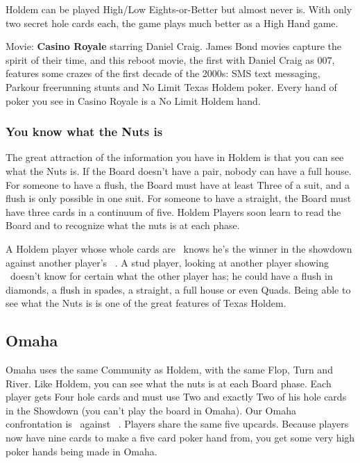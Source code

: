 Holdem can be played High/Low Eights-or-Better but almost never
is. With only two secret hole cards each, the game plays much better
as a High Hand game.

Movie: \textbf{Casino Royale} starring Daniel Craig. James Bond movies
capture the spirit of their time, and this reboot movie, the first
with Daniel Craig as 007, features some crazes of the first decade of
the 2000s: SMS text messaging, Parkour freerunning stunts and No Limit
Texas Holdem poker. Every hand of poker you see in Casino Royale is a
No Limit Holdem hand.

\subsubsection{You know what the Nuts is}

The great attraction of the information you have in Holdem is that you
can see what the Nuts is. If the Board doesn't have a pair, nobody can
have a full house. For someone to have a flush, the Board must have at
least Three of a suit, and a flush is only possible in one suit. For
someone to have a straight, the Board must have three cards in a
continuum of five. Holdem Players soon learn to read the Board and to
recognize what the nuts is at each phase.

A Holdem player whose whole cards are \Ad\tred\ knows he's the winner
in the showdown against another player's
\back\back\nines\Qd\Jd\tres\fourd\ . A stud player, looking at another
player showing \back\back\nines\Qd\Jd\tres\back\ doesn't know for
certain what the other player has; he could have a flush in diamonds,
a flush in spades, a straight, a full house or even Quads. Being able
to see what the Nuts is is one of the great features of Texas Holdem.

\subsection{Omaha}

Omaha uses the same Community as
Holdem, with the same Flop, Turn and River. Like Holdem, you can see
what the nuts is at each Board phase. Each player gets Four hole
cards and must use Two and exactly Two of his hole cards in the
Showdown (you can't play the board in Omaha). Our Omaha confrontation
is 
\back\back\back\back\nines\Qd\Jd\tres\fourd\ against
\back\back\back\back\nines\Qd\Jd\tres\fourd\ . Players share the same five
upcards. Because players now have nine cards to make a five card poker
hand from, you get some very high poker hands being made in Omaha.

